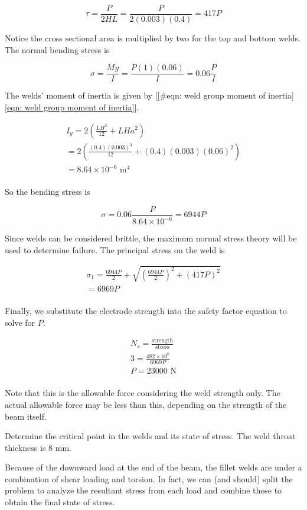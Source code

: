 \documentclass[a4paper,openany,12pt]{book}
\begin{document}
{{$$\tau  = \frac{P}{2HL} = \frac{P}{2(0.003)(0.4)} = 417P$$

Notice the cross sectional area is multiplied by two for the top and
bottom welds. The normal bending stress is

$$\sigma  = \frac{My}{I} = \frac{P(1)(0.06)}{I} = 0.06\frac{P}{I}$$

The welds' moment of inertia is given by
[[\#eqn: weld group moment of inertia]\ref{eqn: weld group moment of inertia}].

$$\begin{gathered}
      I_y = 2\left( \frac{LH^3}{12} + LHa^2 \right) \\ 
      = 2\left( \frac{(0.4)(0.003)^3}{12} + (0.4)(0.003)(0.06)^2 \right) \\ 
      = 8.64 \times 10^{-6} \text{ m}^4 \\ 
    \end{gathered}$$

So the bending stress is

$$\sigma  = 0.06\frac{P}{8.64 \times 10^{-6}} = 6944P$$

Since welds can be considered brittle, the maximum normal stress theory
will be used to determine failure. The principal stress on the weld is

$$\begin{gathered}
      \sigma _1 = \frac{6944P}{2} + \sqrt {\left( \frac{6944P}{2} \right)^2 + (417P)^2}  \\ 
      = 6969P \\ 
    \end{gathered}$$

Finally, we substitute the electrode strength into the safety factor
equation to solve for \(P\).

$$\begin{gathered}
      N_s = \frac{\text{strength}}{\text{stress}} \\ 
      3 = \frac{482 \times 10^6}{6969P} \\ 
      P = 23000 \text{ N} \\ 
    \end{gathered}$$

Note that this is the allowable force considering the weld strength
only. The actual allowable force may be less than this, depending on the
strength of the beam itself.

Determine the critical point in the welds and its state of stress. The
weld throat thickness is 8 mm.


Because of the downward load at the end of the beam, the fillet welds
are under a combination of shear loading and torsion. In fact, we can
(and should) split the problem to analyze the resultant stress from each
load and combine those to obtain the final state of stress.

}}
\end{document}
